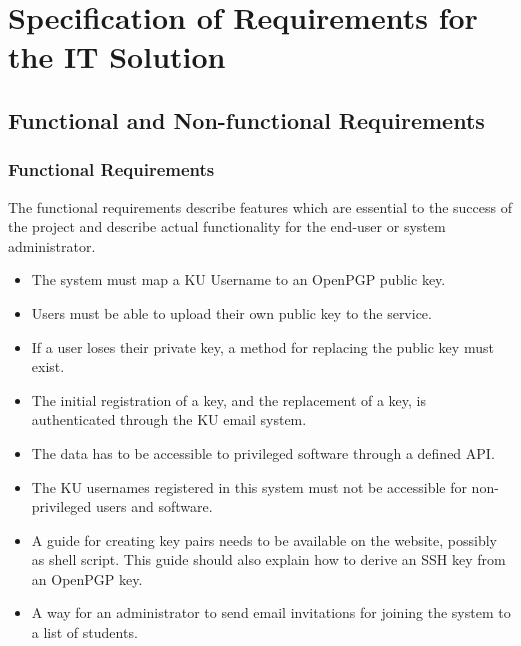\documentclass[11pt,a4paper]{report}
\begin{document}
\renewcommand{\thesubsection}{\thesection.\alph{subsection}}
\section{Specification of Requirements for the IT Solution}\label{sec:Requirements}
\subsection{Functional and Non-functional Requirements}
\subsubsection{Functional Requirements}\label{subsubsec:Functional_Req}
The functional requirements describe features which are essential to the success of the project and describe actual functionality for the end-user or system administrator.
\begin{itemize}
\item The system must map a KU Username to an OpenPGP public key.
\item Users must be able to upload their own public key to the service.
\item If a user loses their private key, a method for replacing the public key must exist.
\item The initial registration of a key, and the replacement of a key, is authenticated through the KU email system.
\item The data has to be accessible to privileged software through a defined API.
\item The KU usernames registered in this system must not be accessible for non-privileged users and software.
\item A guide for creating key pairs needs to be available on the website, possibly as shell script. This guide should also explain how to derive an SSH key from an OpenPGP key.
\item A way for an administrator to send email invitations for joining the system to a list of students.
\end{itemize}
\end{document}
